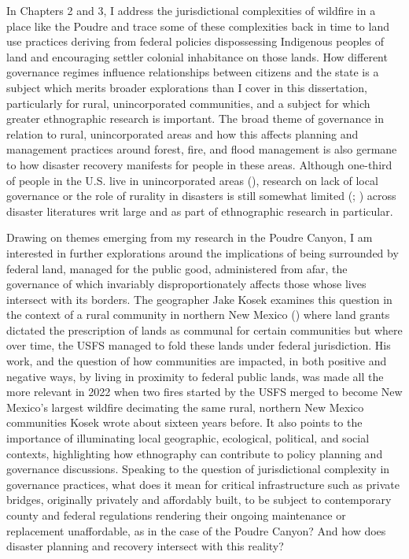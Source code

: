\documentclass[
]{article}
\begin{document}
In Chapters 2 and 3, I address the jurisdictional complexities of wildfire in a place like the Poudre and trace some of these complexities back in time to land use practices deriving from federal policies dispossessing Indigenous peoples of land and encouraging settler colonial inhabitance on those lands. How different governance regimes influence relationships between citizens and the state is a subject which merits broader explorations than I cover in this dissertation, particularly for rural, unincorporated communities, and a subject for which greater ethnographic research is important. The broad theme of governance in relation to rural, unincorporated areas and how this affects planning and management practices around forest, fire, and flood management is also germane to how disaster recovery manifests for people in these areas. Although one-third of people in the U.S. live in unincorporated areas (), research on lack of local governance or the role of rurality in disasters is still somewhat limited (; ) across disaster literatures writ large and as part of ethnographic research in particular.

Drawing on themes emerging from my research in the Poudre Canyon, I am interested in further explorations around the implications of being surrounded by federal land, managed for the public good, administered from afar, the governance of which invariably disproportionately affects those whose lives intersect with its borders. The geographer Jake Kosek examines this question in the context of a rural community in northern New Mexico () where land grants dictated the prescription of lands as communal for certain communities but where over time, the USFS managed to fold these lands under federal jurisdiction. His work, and the question of how communities are impacted, in both positive and negative ways, by living in proximity to federal public lands, was made all the more relevant in 2022 when two fires started by the USFS merged to become New Mexico's largest wildfire decimating the same rural, northern New Mexico communities Kosek wrote about sixteen years before. It also points to the importance of illuminating local geographic, ecological, political, and social contexts, highlighting how ethnography can contribute to policy planning and governance discussions. Speaking to the question of jurisdictional complexity in governance practices, what does it mean for critical infrastructure such as private bridges, originally privately and affordably built, to be subject to contemporary county and federal regulations rendering their ongoing maintenance or replacement unaffordable, as in the case of the Poudre Canyon? And how does disaster planning and recovery intersect with this reality?
\end{document}
